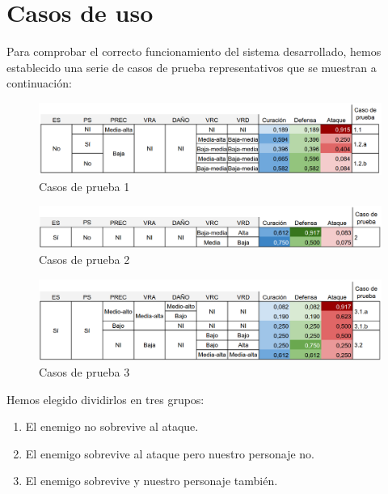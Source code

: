 \section{Casos de uso}

Para comprobar el correcto funcionamiento del sistema desarrollado, hemos establecido una serie de casos de prueba representativos que se muestran a continuación:

\begin{figure}[H]
	\centering
	\includegraphics[width=\textwidth,height=\textheight,keepaspectratio]{images/casos_pruebas.png}
	\caption{Casos de prueba 1}
	\label{fig:casos_prueba1}
\end{figure}

\begin{figure}[H]
	\centering
	\includegraphics[width=\textwidth,height=\textheight,keepaspectratio]{images/casos_pruebas1.png}
	\caption{Casos de prueba 2}
	\label{fig:casos_prueba2}
\end{figure}


\begin{figure}[H]
	\centering
	\includegraphics[width=\textwidth,height=\textheight,keepaspectratio]{images/casos_pruebas2.png}
	\caption{Casos de prueba 3}
	\label{fig:casos_prueba3}
\end{figure}
Hemos elegido dividirlos en tres grupos:
\begin{enumerate}
	\item El enemigo no sobrevive al ataque.
	\item El enemigo sobrevive al ataque pero nuestro personaje no.
	\item El enemigo sobrevive y nuestro personaje también.
\end{enumerate}


